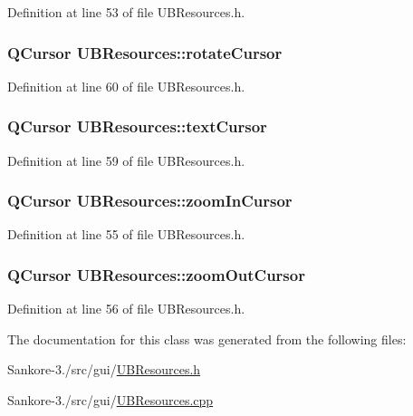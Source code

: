 Definition at line 53 of file U\-B\-Resources.\-h.

\hypertarget{class_u_b_resources_ab236f6e21733987cf38e8d2d3f35b341}{
\subsubsection[{rotate\-Cursor}]{\setlength{\rightskip}{0pt plus 5cm}Q\-Cursor U\-B\-Resources\-::rotate\-Cursor}}\label{d8/d23/class_u_b_resources_ab236f6e21733987cf38e8d2d3f35b341}


Definition at line 60 of file U\-B\-Resources.\-h.

\hypertarget{class_u_b_resources_a3c7b9b13f2adc873f577fac9a30093c7}{
\subsubsection[{text\-Cursor}]{\setlength{\rightskip}{0pt plus 5cm}Q\-Cursor U\-B\-Resources\-::text\-Cursor}}\label{d8/d23/class_u_b_resources_a3c7b9b13f2adc873f577fac9a30093c7}


Definition at line 59 of file U\-B\-Resources.\-h.

\hypertarget{class_u_b_resources_a93fb66f40e17870cbd56579f528f9667}{
\subsubsection[{zoom\-In\-Cursor}]{\setlength{\rightskip}{0pt plus 5cm}Q\-Cursor U\-B\-Resources\-::zoom\-In\-Cursor}}\label{d8/d23/class_u_b_resources_a93fb66f40e17870cbd56579f528f9667}


Definition at line 55 of file U\-B\-Resources.\-h.

\hypertarget{class_u_b_resources_a83e6b8bd0380901222ea318c647290f7}{
\subsubsection[{zoom\-Out\-Cursor}]{\setlength{\rightskip}{0pt plus 5cm}Q\-Cursor U\-B\-Resources\-::zoom\-Out\-Cursor}}\label{d8/d23/class_u_b_resources_a83e6b8bd0380901222ea318c647290f7}


Definition at line 56 of file U\-B\-Resources.\-h.



The documentation for this class was generated from the following files\-:\begin{DoxyCompactItemize}
\item 
Sankore-\/3./src/gui/\hyperlink{_u_b_resources_8h}{U\-B\-Resources.\-h}\item 
Sankore-\/3./src/gui/\hyperlink{_u_b_resources_8cpp}{U\-B\-Resources.\-cpp}\end{DoxyCompactItemize}
